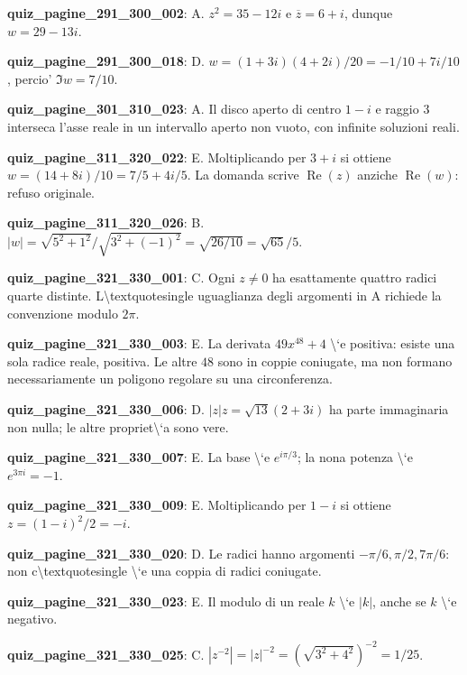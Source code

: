 \documentclass[11pt,a4paper]{article}
\newcounter{quiz}
\begin{document}
\noindent\textbf{quiz\_pagine\_291\_300\_002}: A. $z^2=35-12i$ e $\overline z=6+i$, dunque $w=29-13i$.\par\medskip
\noindent\textbf{quiz\_pagine\_291\_300\_018}: D. $w=(1+3i)(4+2i)/20=-1/10+7i/10$, percio' $\Im w=7/10$.\par\medskip
\noindent\textbf{quiz\_pagine\_301\_310\_023}: A. Il disco aperto di centro $1-i$ e raggio $3$ interseca l'asse reale in un intervallo aperto non vuoto, con infinite soluzioni reali.\par\medskip
\noindent\textbf{quiz\_pagine\_311\_320\_022}: E. Moltiplicando per $3+i$ si ottiene $w=(14+8i)/10=7/5+4i/5$. La domanda scrive $\operatorname{Re}(z)$ anziche $\operatorname{Re}(w)$: refuso originale.\par\medskip
\noindent\textbf{quiz\_pagine\_311\_320\_026}: B. $|w|=\sqrt{5^2+1^2}/\sqrt{3^2+(-1)^2}=\sqrt{26/10}=\sqrt{65}/5$.\par\medskip
\noindent\textbf{quiz\_pagine\_321\_330\_001}: C. Ogni $z\neq0$ ha esattamente quattro radici quarte distinte. L\textbackslash{}textquotesingle uguaglianza degli argomenti in A richiede la convenzione modulo $2\pi$.\par\medskip
\noindent\textbf{quiz\_pagine\_321\_330\_003}: E. La derivata $49x^{48}+4$ \textbackslash{}`e positiva: esiste una sola radice reale, positiva. Le altre $48$ sono in coppie coniugate, ma non formano necessariamente un poligono regolare su una circonferenza.\par\medskip
\noindent\textbf{quiz\_pagine\_321\_330\_006}: D. $|z|z=\sqrt{13}(2+3i)$ ha parte immaginaria non nulla; le altre propriet\textbackslash{}`a sono vere.\par\medskip
\noindent\textbf{quiz\_pagine\_321\_330\_007}: E. La base \textbackslash{}`e $e^{i\pi/3}$; la nona potenza \textbackslash{}`e $e^{3\pi i}=-1$.\par\medskip
\noindent\textbf{quiz\_pagine\_321\_330\_009}: E. Moltiplicando per $1-i$ si ottiene $z=(1-i)^2/2=-i$.\par\medskip
\noindent\textbf{quiz\_pagine\_321\_330\_020}: D. Le radici hanno argomenti $-\pi/6,\pi/2,7\pi/6$: non c\textbackslash{}textquotesingle \textbackslash{}`e una coppia di radici coniugate.\par\medskip
\noindent\textbf{quiz\_pagine\_321\_330\_023}: E. Il modulo di un reale $k$ \textbackslash{}`e $|k|$, anche se $k$ \textbackslash{}`e negativo.\par\medskip
\noindent\textbf{quiz\_pagine\_321\_330\_025}: C. $|z^{-2}|=|z|^{-2}=(\sqrt{3^2+4^2})^{-2}=1/25$.\par\medskip
\end{document}
